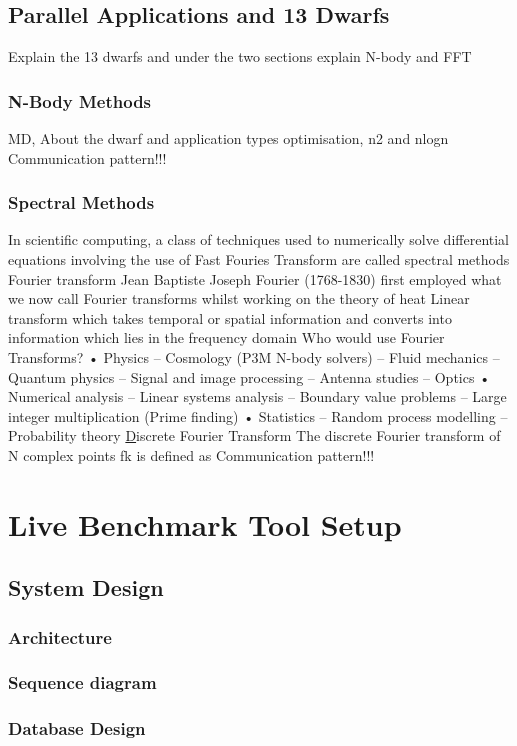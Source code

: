 \documentclass[12pt,a4paper]{report}
\begin{document}
\section{Parallel Applications and 13 Dwarfs}  
Explain the 13 dwarfs and under the two sections explain N-body and FFT  
\subsection{N-Body Methods}  
MD, About the dwarf and application types optimisation, n2 and nlogn  
Communication pattern!!!  
\subsection{Spectral Methods}  
In scientific computing, a class of techniques used to numerically solve differential equations involving the use of Fast Fouries Transform are called spectral methods  
Fourier transform  
Jean Baptiste Joseph Fourier (1768-1830) first employed what we now call Fourier transforms whilst working on the theory of heat   
Linear transform which takes temporal or spatial information and converts into information which lies in the frequency domain  
Who would use Fourier Transforms?   
• Physics   
– Cosmology (P3M N-body solvers)   
– Fluid mechanics   
– Quantum physics   
– Signal and image processing   
– Antenna studies   
– Optics   
• Numerical analysis   
– Linear systems analysis   
– Boundary value problems   
– Large integer multiplication (Prime finding)   
• Statistics   
– Random process modelling   
– Probability theory  
{\underline Discrete Fourier Transform}  
The discrete Fourier transform of N complex points fk is defined as   
Communication pattern!!!  
 



\chapter{Live Benchmark Tool Setup}
\section{System Design}
\subsection{Architecture}
\subsection{Sequence diagram}
\subsection{Database Design}
\end{document}
